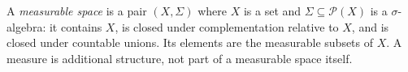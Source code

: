 
A \emph{measurable space} is a pair $(X,\Sigma)$ where $X$ is a set and $\Sigma\subseteq\mathcal P(X)$ is a $\sigma$-algebra: it contains $X$, is closed under complementation relative to $X$, and is closed under countable unions. Its elements are the measurable subsets of $X$. A measure is additional structure, not part of a measurable space itself.
